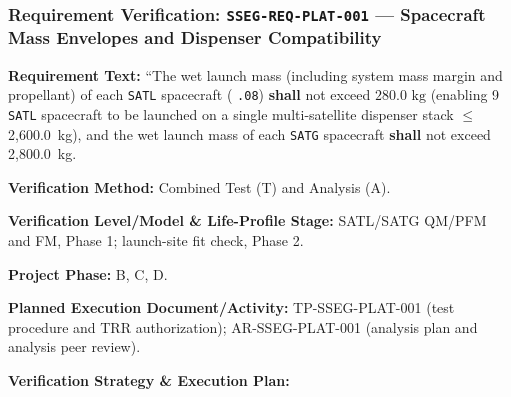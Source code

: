 \subsubsection{Requirement Verification: \texttt{SSEG-REQ-PLAT-001} --- Spacecraft Mass Envelopes and Dispenser Compatibility}
\label{ver:SSEG-REQ-PLAT-001}
\textbf{Requirement Text:} ``The wet launch mass (including system mass margin and propellant) of each \texttt{SATL} spacecraft ( \texttt{.08}) \textbf{shall} not exceed $280.0\text{ kg}$ (enabling 9 \texttt{SATL} spacecraft to be launched on a single multi-satellite dispenser stack $\le$ 2,600.0~kg), and the wet launch mass of each \texttt{SATG} spacecraft \textbf{shall} not exceed 2,800.0~kg.
\par\textbf{Verification Method:} Combined Test (T) and Analysis (A).
\par\textbf{Verification Level/Model \& Life-Profile Stage:} SATL/SATG QM/PFM and FM, Phase 1; launch-site fit check, Phase 2.
\par\textbf{Project Phase:} B, C, D.
\par\textbf{Planned Execution Document/Activity:} TP-SSEG-PLAT-001 (test procedure and TRR authorization); AR-SSEG-PLAT-001 (analysis plan and analysis peer review).
\par\textbf{Verification Strategy \& Execution Plan:}
